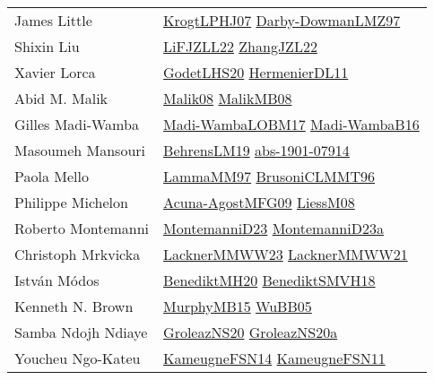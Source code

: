 {\begin{longtable}{p{4cm}p{20cm}}
James Little & \href{papers/KrogtLPHJ07.pdf}{KrogtLPHJ07}\cite{KrogtLPHJ07} \href{articles/Darby-DowmanLMZ97.pdf}{Darby-DowmanLMZ97}\cite{Darby-DowmanLMZ97} \\
Shixin Liu & \href{papers/LiFJZLL22.pdf}{LiFJZLL22}\cite{LiFJZLL22} \href{papers/ZhangJZL22.pdf}{ZhangJZL22}\cite{ZhangJZL22} \\
Xavier Lorca & \href{papers/GodetLHS20.pdf}{GodetLHS20}\cite{GodetLHS20} \href{papers/HermenierDL11.pdf}{HermenierDL11}\cite{HermenierDL11} \\
Abid M. Malik & \href{}{Malik08}\cite{Malik08} \href{}{MalikMB08}\cite{MalikMB08} \\
Gilles Madi{-}Wamba & \href{papers/Madi-WambaLOBM17.pdf}{Madi-WambaLOBM17}\cite{Madi-WambaLOBM17} \href{papers/Madi-WambaB16.pdf}{Madi-WambaB16}\cite{Madi-WambaB16} \\
Masoumeh Mansouri & \href{papers/BehrensLM19.pdf}{BehrensLM19}\cite{BehrensLM19} \href{articles/abs-1901-07914.pdf}{abs-1901-07914}\cite{abs-1901-07914} \\
Paola Mello & \href{articles/LammaMM97.pdf}{LammaMM97}\cite{LammaMM97} \href{papers/BrusoniCLMMT96.pdf}{BrusoniCLMMT96}\cite{BrusoniCLMMT96} \\
Philippe Michelon & \href{papers/Acuna-AgostMFG09.pdf}{Acuna-AgostMFG09}\cite{Acuna-AgostMFG09} \href{articles/LiessM08.pdf}{LiessM08}\cite{LiessM08} \\
Roberto Montemanni & \href{articles/MontemanniD23.pdf}{MontemanniD23}\cite{MontemanniD23} \href{articles/MontemanniD23a.pdf}{MontemanniD23a}\cite{MontemanniD23a} \\
Christoph Mrkvicka & \href{articles/LacknerMMWW23.pdf}{LacknerMMWW23}\cite{LacknerMMWW23} \href{papers/LacknerMMWW21.pdf}{LacknerMMWW21}\cite{LacknerMMWW21} \\
Istv{\'{a}}n M{\'{o}}dos & \href{articles/BenediktMH20.pdf}{BenediktMH20}\cite{BenediktMH20} \href{papers/BenediktSMVH18.pdf}{BenediktSMVH18}\cite{BenediktSMVH18} \\
Kenneth N. Brown & \href{papers/MurphyMB15.pdf}{MurphyMB15}\cite{MurphyMB15} \href{papers/WuBB05.pdf}{WuBB05}\cite{WuBB05} \\
Samba Ndojh Ndiaye & \href{papers/GroleazNS20.pdf}{GroleazNS20}\cite{GroleazNS20} \href{papers/GroleazNS20a.pdf}{GroleazNS20a}\cite{GroleazNS20a} \\
Youcheu Ngo{-}Kateu & \href{articles/KameugneFSN14.pdf}{KameugneFSN14}\cite{KameugneFSN14} \href{papers/KameugneFSN11.pdf}{KameugneFSN11}\cite{KameugneFSN11} \\

\end{longtable}}
